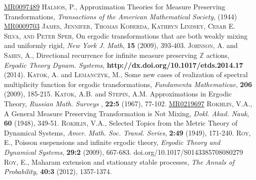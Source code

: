\documentclass[12pt]{amsart}
\begin{document}
\begin{thebibliography}{9}
{\href{http://www.ams.org/mathscinet-getitem?mr={0097489}}{MR{0097489}}}
\textsc{Halmos, P.}, Approximation Theories for Measure Preserving Transformations, \textit{Transactions of the American Mathematical Society},
(1944) {\href{http://www.ams.org/mathscinet-getitem?mr={0009703}}{MR{0009703}}}
 \textsc{James, Jennifer, Thomas Koberda, Kathryn Lindsey, Cesar E. Silva, and Peter Speh}, On ergodic transformations that are both weakly mixing and uniformly rigid, \textit{New York J. Math}, \textbf{15} (2009), 393-403.
 \textsc{Johnson, A.} and \textsc{Sahin, A.}, Directional recurrence for infinite measure preserving $\mathbb{Z}$ actions, \textit{Ergodic Theory Dynam. Systems},  \textbf{http://dx.doi.org/10.1017/etds.2014.17} (2014).
 \textsc{Katok, A.} and \textsc{Lemanczyk, M.}, Some new cases of realization of spectral multiplicity function for ergodic transformations, \textit{Fundamenta Mathematicae}, \textbf{206} (2009), 185-215.
 \textsc{Katok, A.B.} and \textsc{Stepin, A.M.} Approximations in Ergodic Theory,  \textit{Russian Math. Surveys }, \textbf{22:5} (1967), 77-102. 
{\href{http://www.ams.org/mathscinet-getitem?mr={0219697}}{MR{0219697}}}
 \textsc{Rokhlin, V.A.}, A General Measure Preserving Transformation is Not Mixing, \textit{Dokl. Akad. Nauk}, \textbf{60} (1948), 349-51.
 \textsc{Rokhlin, V.A.}, Selected Topics from the Metric Theory of Dynamical Systems, \textit{Amer. Math. Soc. Transl. Series}, \textbf{2:49} (1949), 171-240.
  \textsc{Roy, E.}, Poisson suspensions and infinite ergodic theory, \textit{Ergodic Theory and Dynamical Systems}, \textbf{29:2} (2009), 667-683. doi.org/10.1017/S0143385708080279 
  \textsc{Roy, E.}, Maharam extension and stationary stable processes, \textit{The Annals of Probability}, \textbf{40:3} (2012), 1357-1374.
\end{thebibliography}
\end{document}
